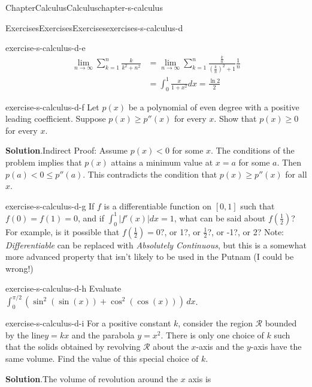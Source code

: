 \documentclass[oneside,10pt,]{book}
\newcommand{\blocktitlefont}{\relax}
\numberwithin{equation}{section}
\newcommand{\lt}{<}
\begin{document}
\begin{chapterptx}{Chapter}{Calculus}{}{Calculus}{}{}{chapter-s-calculus}
\begin{exercises-section}{Exercises}{Exercises}{}{Exercises}{}{}{exercises-s-calculus-d}
\begin{divisionexercise}{4}{}{}{exercise-s-calculus-d-e}
\begin{equation*}
\begin{split}
\lim_{n\to \infty }\sum _{k=1}^n \frac{k}{k^2+n^2} &=\lim_{n\to \infty }\sum _{k=1}^n \frac{\frac{k}{n}}{(\frac{k}{n})^2+1}\frac{1}{n}\\
& = \int_0^1 \frac{x}{1+x^2} dx = \frac{\ln 2}{2}
\end{split}
\end{equation*}
%
\end{divisionexercise}%
\begin{divisionexercise}{5}{}{}{exercise-s-calculus-d-f}%
Let \(p(x)\) be a polynomial of even degree with a positive leading coefficient. Suppose \(p(x)\geq p''(x)	\) for every \(x\). Show that \(p(x) \geq  0\) for every \(x\).%
\par\smallskip%
\noindent\textbf{\blocktitlefont Solution}.\hypertarget{solution-s-calculus-d-f-b}{}\quad{}Indirect Proof:  Assume \(p(x)\lt 0\) for some \(x\).  The conditions of the problem implies that \(p(x)\) attains a minimum value at \(x=a\) for some \(a\).  Then \(p(a) \lt 0 \leq p''(a)\).  This contradicts the condition that \(p(x)\geq p''(x)\) for all \(x\).%
\end{divisionexercise}%
\begin{divisionexercise}{6}{}{}{exercise-s-calculus-d-g}%
If \(f\) is a differentiable function on \([0,1]\) such that \(f(0)=f(1)=0\), and if \(\int_0^1 \left| f'(x)\right| dx=1\), what can be said about \(f\left(\frac{1}{2}\right)\)? For example, is it possible that \(f\left(\frac{1}{2}\right)=0?\), or 1?, or \(\frac{1}{2}\)?, or -1?, or 2? Note: \emph{Differentiable} can be replaced with \emph{Absolutely Continuous}, but this is a somewhat more advanced property that isn't likely to be used in the Putnam (I could be wrong!)%
\end{divisionexercise}%
\begin{divisionexercise}{7}{}{}{exercise-s-calculus-d-h}%
Evaluate \(\int_{ 0}^{ \pi /2} \left(\sin ^2(\sin (x))+\cos ^2(\cos (x))\right) \, dx\).%
\end{divisionexercise}%
\begin{divisionexercise}{8}{}{}{exercise-s-calculus-d-i}%
For a positive constant \(k\), consider the region \(\mathcal{R}\) bounded by the line\(y = k x\) and the parabola \(y = x^2\). There is only one choice of \(k\) such that the solids obtained by revolving \(\mathcal{R}\) about the \(x\)-axis and the \(y\)-axis have the same volume. Find the value of this special choice of \(k\).%
\par\smallskip%
\noindent\textbf{\blocktitlefont Solution}.\hypertarget{solution-s-calculus-d-i-b}{}\quad{}The volume of revolution around the \(x\) axis is%

\end{divisionexercise}
\end{exercises-section}
\end{chapterptx}
\end{document}
